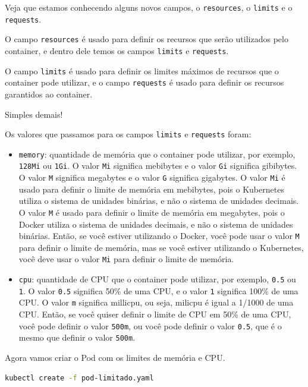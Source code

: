\documentclass[12pt,a4paper]{article}
\begin{document}
Veja que estamos conhecendo alguns novos campos, o \texttt{resources}, o \texttt{limits} e o \texttt{requests}.

O campo \texttt{resources} é usado para definir os recursos que serão utilizados pelo container, e dentro dele temos os campos \texttt{limits} e \texttt{requests}.

O campo \texttt{limits} é usado para definir os limites máximos de recursos que o container pode utilizar, e o campo \texttt{requests} é usado para definir os recursos garantidos ao container.

Simples demais! 

Os valores que passamos para os campos \texttt{limits} e \texttt{requests} foram:

\begin{itemize}
    \item \texttt{memory}: quantidade de memória que o container pode utilizar, por exemplo, \texttt{128Mi} ou \texttt{1Gi}. O valor \texttt{Mi} significa mebibytes e o valor \texttt{Gi} significa gibibytes. O valor \texttt{M} significa megabytes e o valor \texttt{G} significa gigabytes. O valor \texttt{Mi} é usado para definir o limite de memória em mebibytes, pois o Kubernetes utiliza o sistema de unidades binárias, e não o sistema de unidades decimais. O valor \texttt{M} é usado para definir o limite de memória em megabytes, pois o Docker utiliza o sistema de unidades decimais, e não o sistema de unidades binárias. Então, se você estiver utilizando o Docker, você pode usar o valor \texttt{M} para definir o limite de memória, mas se você estiver utilizando o Kubernetes, você deve usar o valor \texttt{Mi} para definir o limite de memória.
    \item \texttt{cpu}: quantidade de CPU que o container pode utilizar, por exemplo, \texttt{0.5} ou \texttt{1}. O valor \texttt{0.5} significa 50\% de uma CPU, e o valor \texttt{1} significa 100\% de uma CPU. O valor \texttt{m} significa millicpu, ou seja, milicpu é igual a 1/1000 de uma CPU. Então, se você quiser definir o limite de CPU em 50\% de uma CPU, você pode definir o valor \texttt{500m}, ou você pode definir o valor \texttt{0.5}, que é o mesmo que definir o valor \texttt{500m}.
\end{itemize}

Agora vamos criar o Pod com os limites de memória e CPU.

\begin{lstlisting}[language=bash]
kubectl create -f pod-limitado.yaml
\end{lstlisting}
\end{document}
